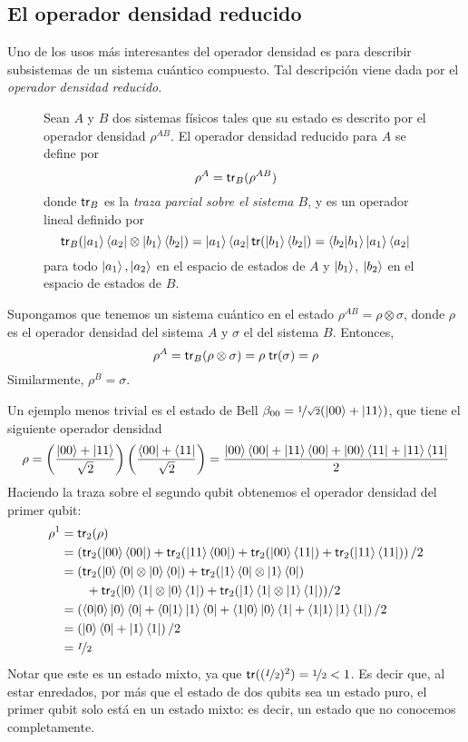 \subsection{El operador densidad reducido}
Uno de los usos más interesantes del operador densidad es para describir
subsistemas de un sistema cuántico compuesto. Tal descripción viene dada por el
\emph{operador densidad reducido}.

\begin{figure}[H]
\begin{definicion}
  Sean $A$ y $B$ dos sistemas físicos tales que su estado es descrito por el
  operador densidad $\rho^{AB}$. El operador densidad reducido para $A$ se
  define por
  \[
    \rho^A = \mathsf{tr}_B(\rho^{AB})
  \]
  donde $\mathsf{tr}_B$ es la \emph{traza parcial sobre el sistema $B$}, y es un
  operador lineal definido por
  \[
    \mathsf{tr}_B(\ket{a_1}\bra{a_2}\otimes\ket{b_1}\bra{b_2}) =
    \ket{a_1}\bra{a_2}\mathsf{tr}(\ket{b_1}\bra{b_2})=\braket{b_2|b_1}\ket{a_1}\bra{a_2}
  \]
  para todo $\ket{a_1},\ket{a_2}$ en el espacio de estados de $A$ y $\ket{b_1}$,
  $\ket{b_2}$ en el espacio de estados de $B$.
\end{definicion}
\end{figure}

\begin{ejemplos}
  Supongamos que tenemos un sistema cuántico en el estado
  $\rho^{AB}=\rho\otimes\sigma$, donde $\rho$ es el operador densidad del
  sistema $A$ y $\sigma$ el del sistema $B$. Entonces,
  \[
    \rho^A = \mathsf{tr}_B(\rho\otimes\sigma)=\rho\;\mathsf{tr}(\sigma)=\rho
  \]
  Similarmente, $\rho^B=\sigma$.

  Un ejemplo menos trivial es el estado de Bell \(\beta_{00}=\nicefrac 1{\sqrt
    2}(\ket{00}+\ket{11})\), que tiene el siguiente operador densidad
  \[
    \rho=\left(\frac{\ket{00}+\ket{11}}{\sqrt 2}\right)
    \left(\frac{\bra{00}+\bra{11}}{\sqrt 2}\right)
    =\frac{\ket{00}\bra{00}+\ket{11}\bra{00}+\ket{00}\bra{11}+\ket{11}\bra{11}}2
  \]
  Haciendo la traza sobre el segundo qubit obtenemos el operador densidad del primer qubit:
  \begin{align*}
    \rho^1 
    &= \mathsf{tr}_2(\rho)\\&=\left(\mathsf{tr}_2(\ket{00}\bra{00})+\mathsf{tr}_2(\ket{11}\bra{00})+\mathsf{tr}_2(\ket{00}\bra{11})+\mathsf{tr}_2(\ket{11}\bra{11})\right)/2\\
    &=(\mathsf{tr}_2(\ket 0\bra 0\otimes\ket 0\bra 0)+\mathsf{tr}_2(\ket 1\bra 0\otimes\ket 1\bra 0)\\
    &\qquad +\mathsf{tr}_2(\ket 0\bra 1\otimes\ket 0\bra 1)+\mathsf{tr}_2(\ket 1\bra 1\otimes\ket 1\bra 1))/2\\
    &=\left(\braket{0|0}\ket 0\bra 0+\braket{0|1}\ket 1\bra 0+\braket{1|0}\ket 0\bra 1+\braket{1|1}\ket 1\bra 1\right)/2\\
    &=\left(\ket 0\bra 0+\ket 1\bra 1\right)/2\\
    &=\nicefrac I2
  \end{align*}
  Notar que este es un estado mixto, ya que $\mathsf{tr}((\nicefrac I2)^2) = \nicefrac 12<1$. Es decir que, al estar enredados, por más que el estado de dos qubits
  sea un estado puro, el primer qubit solo está en un estado mixto: es decir, un
  estado que no conocemos completamente.
\end{ejemplos}

